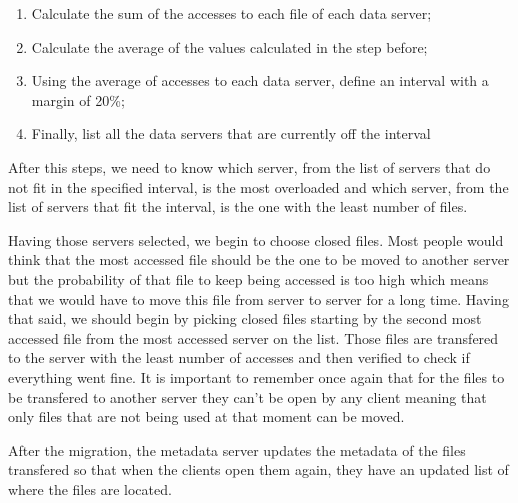 \begin{enumerate}

\item Calculate the sum of the accesses to each file of each data server;
\item Calculate the average of the values calculated in the step before;
\item Using the average of accesses to each data server, define an interval with
a margin of 20\%;
\item Finally, list all the data servers that are currently off the interval

\end{enumerate}

After this steps, we need to know which server, from the list of servers that do not
fit in the specified interval, is the most overloaded and which server, from the list
of servers that fit the interval, is the one with the least number of files.

Having those servers selected, we begin to choose closed files. Most people would
think that the most accessed file should be the one to be moved to another server
but the probability of that file to keep being accessed is too high which means that
we would have to move this file from server to server for a long time. Having that said,
we should begin by picking closed files starting by the second most accessed file from
the most accessed server on the list. Those files are transfered to the server with
the least number of accesses and then verified to check if everything went fine. It is
important to remember once again that for the files to be transfered to another
server they can't be open by any client meaning that only files that are not being used
at that moment can be moved.

After the migration, the metadata server updates the metadata of the files transfered
so that when the clients open them again, they have an updated list of where the files
are located.


